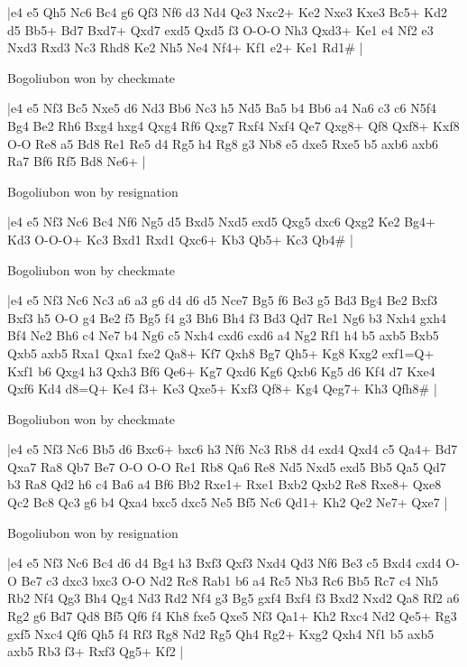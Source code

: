 \makegametitle
|e4 e5 Qh5 Nc6 Bc4 g6 Qf3 Nf6 d3 Nd4 Qe3 Nxc2+ Ke2 Nxe3 Kxe3 Bc5+ Kd2 d5 Bb5+ Bd7 Bxd7+ Qxd7 exd5 Qxd5 f3 O-O-O Nh3 Qxd3+ Ke1 e4 Nf2 e3 Nxd3 Rxd3 Nc3 Rhd8 Ke2 Nh5 Ne4 Nf4+ Kf1 e2+ Ke1 Rd1\#  |

\showboard

Bogoliubon won by checkmate

\makegametitle
|e4 e5 Nf3 Bc5 Nxe5 d6 Nd3 Bb6 Nc3 h5 Nd5 Ba5 b4 Bb6 a4 Na6 c3 c6 N5f4 Bg4 Be2 Rh6 Bxg4 hxg4 Qxg4 Rf6 Qxg7 Rxf4 Nxf4 Qe7 Qxg8+ Qf8 Qxf8+ Kxf8 O-O Re8 a5 Bd8 Re1 Re5 d4 Rg5 h4 Rg8 g3 Nb8 e5 dxe5 Rxe5 b5 axb6 axb6 Ra7 Bf6 Rf5 Bd8 Ne6+  |

\showboard

Bogoliubon won by resignation

\makegametitle
|e4 e5 Nf3 Nc6 Bc4 Nf6 Ng5 d5 Bxd5 Nxd5 exd5 Qxg5 dxc6 Qxg2 Ke2 Bg4+ Kd3 O-O-O+ Kc3 Bxd1 Rxd1 Qxc6+ Kb3 Qb5+ Kc3 Qb4\#  |

\showboard

Bogoliubon won by checkmate

\makegametitle
|e4 e5 Nf3 Nc6 Nc3 a6 a3 g6 d4 d6 d5 Nce7 Bg5 f6 Be3 g5 Bd3 Bg4 Be2 Bxf3 Bxf3 h5 O-O g4 Be2 f5 Bg5 f4 g3 Bh6 Bh4 f3 Bd3 Qd7 Re1 Ng6 b3 Nxh4 gxh4 Bf4 Ne2 Bh6 c4 Ne7 b4 Ng6 c5 Nxh4 cxd6 cxd6 a4 Ng2 Rf1 h4 b5 axb5 Bxb5 Qxb5 axb5 Rxa1 Qxa1 fxe2 Qa8+ Kf7 Qxh8 Bg7 Qh5+ Kg8 Kxg2 exf1=Q+ Kxf1 b6 Qxg4 h3 Qxh3 Bf6 Qe6+ Kg7 Qxd6 Kg6 Qxb6 Kg5 d6 Kf4 d7 Kxe4 Qxf6 Kd4 d8=Q+ Ke4 f3+ Ke3 Qxe5+ Kxf3 Qf8+ Kg4 Qeg7+ Kh3 Qfh8\#  |

\showboard

Bogoliubon won by checkmate

\makegametitle
|e4 e5 Nf3 Nc6 Bb5 d6 Bxc6+ bxc6 h3 Nf6 Nc3 Rb8 d4 exd4 Qxd4 c5 Qa4+ Bd7 Qxa7 Ra8 Qb7 Be7 O-O O-O Re1 Rb8 Qa6 Re8 Nd5 Nxd5 exd5 Bb5 Qa5 Qd7 b3 Ra8 Qd2 h6 c4 Ba6 a4 Bf6 Bb2 Rxe1+ Rxe1 Bxb2 Qxb2 Re8 Rxe8+ Qxe8 Qc2 Bc8 Qc3 g6 b4 Qxa4 bxc5 dxc5 Ne5 Bf5 Nc6 Qd1+ Kh2 Qe2 Ne7+ Qxe7  |

\showboard

Bogoliubon won by resignation

\makegametitle
|e4 e5 Nf3 Nc6 Bc4 d6 d4 Bg4 h3 Bxf3 Qxf3 Nxd4 Qd3 Nf6 Be3 c5 Bxd4 cxd4 O-O Be7 c3 dxc3 bxc3 O-O Nd2 Rc8 Rab1 b6 a4 Rc5 Nb3 Rc6 Bb5 Rc7 c4 Nh5 Rb2 Nf4 Qg3 Bh4 Qg4 Nd3 Rd2 Nf4 g3 Bg5 gxf4 Bxf4 f3 Bxd2 Nxd2 Qa8 Rf2 a6 Rg2 g6 Bd7 Qd8 Bf5 Qf6 f4 Kh8 fxe5 Qxe5 Nf3 Qa1+ Kh2 Rxc4 Nd2 Qe5+ Rg3 gxf5 Nxc4 Qf6 Qh5 f4 Rf3 Rg8 Nd2 Rg5 Qh4 Rg2+ Kxg2 Qxh4 Nf1 b5 axb5 axb5 Rb3 f3+ Rxf3 Qg5+ Kf2  |

